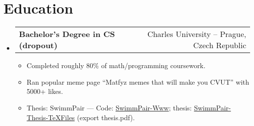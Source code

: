 \documentclass[letterpaper,11pt]{article}
\makeatletter
\newcommand{\sitem}[1]{\item #1 \vspace{-2pt}}
\newcommand{\resumeSubheadingg}[2]{
  \vspace{-1pt}\item
    \begin{tabular*}{0.97\textwidth}[t]{l@{\extracolsep{\fill}}r}
      \textbf{#1} & #2
    \end{tabular*}\vspace{-5pt}
}
\newenvironment{subheadingListing}{\begin{itemize}[leftmargin=*]}{\end{itemize}}
\newenvironment{resumeList}{\begin{itemize}}{\end{itemize}\vspace{-5pt}}
\makeatother
\begin{document}
\section{Education}
\begin{subheadingListing}

  \resumeSubheadingg
  {Bachelor's Degree in CS (dropout)}{Charles University – Prague, Czech Republic}

  \begin{resumeList}
    \sitem{Completed roughly 80\% of math/programming coursework.}
    \sitem{Ran popular meme page “Matfyz memes that will make you CVUT” with 5000+ likes.}
    \sitem{Thesis: SwimmPair --- Code: \href{https://github.com/KlosStepan/SwimmPair-Www}{SwimmPair-Www}; thesis: \href{https://github.com/KlosStepan/SwimmPair-Thesis-TeXFiles}{SwimmPair-Thesis-TeXFiles} (export thesis.pdf).}
  \end{resumeList}
\end{subheadingListing}


\end{document}
